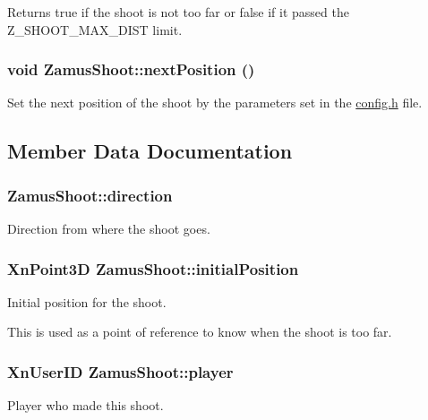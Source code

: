 \begin{DoxyReturn}{Returns}
true if the shoot is not too far or false if it passed the Z\_\-SHOOT\_\-MAX\_\-DIST limit. 
\end{DoxyReturn}
\hypertarget{classZamusShoot_a59597b88cd171964a8f240da485e69c4}{
\subsubsection[{nextPosition}]{\setlength{\rightskip}{0pt plus 5cm}void ZamusShoot::nextPosition ()}}
\label{classZamusShoot_a59597b88cd171964a8f240da485e69c4}
Set the next position of the shoot by the parameters set in the \hyperlink{config_8h}{config.h} file. 

\subsection{Member Data Documentation}
\hypertarget{classZamusShoot_a77f14fc25129a676ec070a77220c6174}{
\subsubsection[{direction}]{ {\bf ZamusShoot::direction}}}
\label{classZamusShoot_a77f14fc25129a676ec070a77220c6174}
Direction from where the shoot goes. \hypertarget{classZamusShoot_a4ea6fd218d7bf2371e53b944042ec7cc}{
\subsubsection[{initialPosition}]{\setlength{\rightskip}{0pt plus 5cm}XnPoint3D {\bf ZamusShoot::initialPosition}}}
\label{classZamusShoot_a4ea6fd218d7bf2371e53b944042ec7cc}
Initial position for the shoot.

This is used as a point of reference to know when the shoot is too far. \hypertarget{classZamusShoot_a38bfd1383bd11ee5d68d22de84904a9f}{
\subsubsection[{player}]{\setlength{\rightskip}{0pt plus 5cm}XnUserID {\bf ZamusShoot::player}}}
\label{classZamusShoot_a38bfd1383bd11ee5d68d22de84904a9f}
Player who made this shoot.


